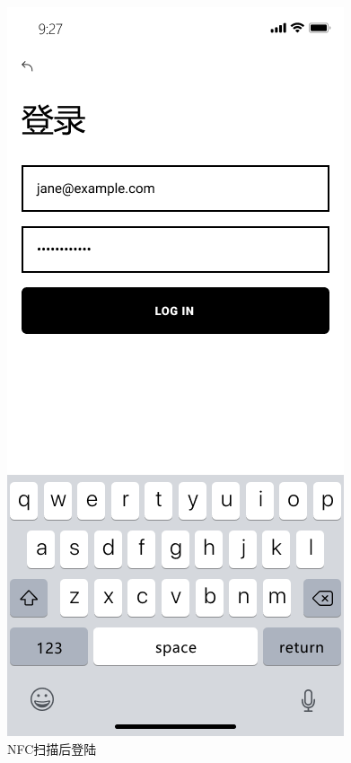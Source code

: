 \documentclass[UTF8]{ctexart}
\begin{document}
\begin{figure}[htbp]
{\begin{minipage}[b]{.3\linewidth}
            \includegraphics[scale=0.3]{Login.png}
        \end{minipage}
    }
    \caption{NFC扫描后登陆}
    \label{Login}
\end{figure}
\end{document}
